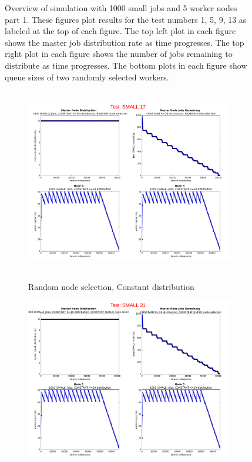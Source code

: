 \documentclass{article}
\begin{document}
\begin{figure}[p]
  
  \caption{Overview of simulation with 1000 small jobs and 5 worker nodes part 1. These figures plot results for the test numbers 1, 5, 9, 13 as labeled at the top of each figure. The top left plot in each figure shows the master job distribution rate as time progresses. The top right plot in each figure shows the number of jobs remaining to distribute as time progresses. The bottom plots in each figure show queue sizes of two randomly selected workers.}
  \label{testSmall1-13} 
  
\end{figure}


\begin{figure}[p] 
  \begin{subfigure}[b]{0.5\linewidth}
    \centering
    \hbox{\hspace{-5.0em} \includegraphics[width=1.2\linewidth]{combined_small_overview/case_small_17} }
    \caption{Random node selection, Constant distribution}
    \label{testSmall17} 
    \vspace{4ex}
  \end{subfigure}%
  \begin{subfigure}[b]{0.5\linewidth}
    \centering
    \includegraphics[width=1.2\linewidth]{combined_small_overview/case_small_21} 

\end{subfigure}
\end{figure}
\end{document}
